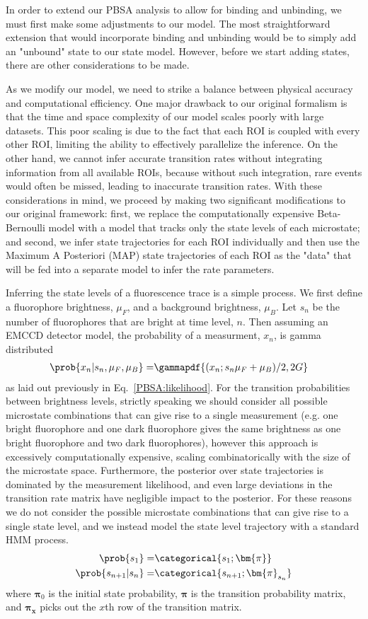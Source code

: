 In order to extend our PBSA analysis to allow for binding and unbinding, we must first make some adjustments to our model. The most straightforward extension that would incorporate binding and unbinding would be to simply add an "unbound" state to our state model. However, before we start adding states, there are other considerations to be made.

As we modify our model, we need to strike a balance between physical accuracy and computational efficiency. One major drawback to our original formalism is that the time and space complexity of our model scales poorly with large datasets. This poor scaling is due to the fact that each ROI is coupled with every other ROI, limiting the ability to effectively parallelize the inference. On the other hand, we cannot infer accurate transition rates without integrating information from all available ROIs, because without such integration, rare events would often be missed, leading to inaccurate transition rates. With these considerations in mind, we proceed by making two significant modifications to our original framework: first, we replace the computationally expensive Beta-Bernoulli model with a model that tracks only the state levels of each microstate; and second, we infer state trajectories for each ROI individually and then use the Maximum A Posteriori (MAP) state trajectories of each ROI as the "data" that will be fed into a separate model to infer the rate parameters.

Inferring the state levels of a fluorescence trace is a simple process. We first define a fluorophore brightness, $\mu_F$, and a background brightness, $\mu_B$. Let $s_n$ be the number of fluorophores that are bright at time level, $n$. Then assuming an EMCCD detector model, the probability of a measurment, $x_n$, is gamma distributed
\begin{align}
    \prob{x_n|s_n,\mu_F,\mu_B} =& \gammapdf{(x_n; s_n\mu_F+\mu_B)/2, 2G}
\end{align}
as laid out previously in Eq.~\eqref{PBSA:likelihood}. For the transition probabilities between brightness levels, strictly speaking we should consider all possible microstate combinations that can give rise to a single measurement (e.g. one bright fluorophore and one dark fluorophore gives the same brightness as one bright fluorophore and two dark fluorophores), however this approach is excessively computationally expensive, scaling combinatorically with the size of the microstate space. Furthermore, the posterior over state trajectories is dominated by the measurement likelihood, and even large deviations in the transition rate matrix have negligible impact to the posterior. For these reasons we do not consider the possible microstate combinations that can give rise to a single state level, and we instead model the state level trajectory with a standard HMM process.
\begin{align}
    \prob{s_1} =& \categorical{s_1; \bm{\pi}}\\
    \prob{s_{n+1}|s_n} =& \categorical{s_{n+1}; \bm{\pi}_{s_n}}
\end{align}
where $\bm{\pi}_0$ is the initial state probability, $\bm{\pi}$ is the transition probability matrix, and $\bm{\pi_x}$ picks out the $x$th row of the transition matrix.

